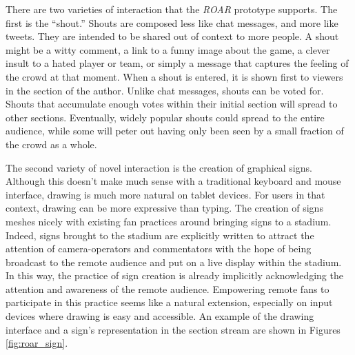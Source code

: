 There are two varieties of interaction that the \emph{ROAR} prototype supports. The first is the ``shout.'' Shouts are composed less like chat messages, and more like tweets. They are intended to be shared out of context to more people. A shout might be a witty comment, a link to a funny image about the game, a clever insult to a hated player or team, or simply a message that captures the feeling of the crowd at that moment. When a shout is entered, it is shown first to viewers in the section of the author. Unlike chat messages, shouts can be voted for. Shouts that accumulate enough votes within their initial section will spread to other sections.  Eventually, widely popular shouts could spread to the entire audience, while some will peter out having only been seen by a small fraction of the crowd as a whole.

The second variety of novel interaction is the creation of graphical signs. Although this doesn't make much sense with a traditional keyboard and mouse interface, drawing is much more natural on tablet devices. For users in that context, drawing can be more expressive than typing. The creation of signs meshes nicely with existing fan practices around bringing signs to a stadium. Indeed, signs brought to the stadium are explicitly written to attract the attention of camera-operators and commentators with the hope of being broadcast to the remote audience and put on a live display within the stadium. In this way, the practice of sign creation is already implicitly acknowledging the attention and awareness of the remote audience. Empowering remote fans to participate in this practice seems like a natural extension, especially on input devices where drawing is easy and accessible. An example of the drawing interface and a sign's representation in the section stream are shown in Figures \ref{fig:roar_sign}.

